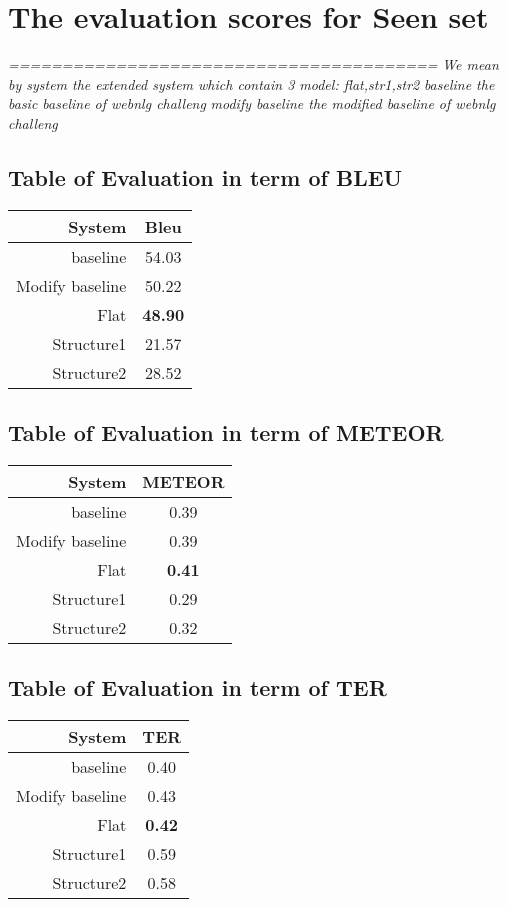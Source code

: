 \documentclass{article}%
\begin{document}
%
\normalsize%
\section{The evaluation scores for Seen set}%
\textit{========================================\newline%
}%
\textit{We mean by system the extended system which contain 3 model: flat,str1,str2\newline%
}%
\textit{baseline the basic baseline of webnlg challeng \newline%
}%
\textit{modify baseline the modified baseline of webnlg challeng \newline%
}%
\subsection{Table of Evaluation in term of BLEU \newline%
}%
\begin{tabular}{|r|c|}%
\hline%
\textbf{System}&\textbf{Bleu}\\%
\hline%
baseline&54.03\\%
\hline%
Modify baseline&50.22\\%
\hline%
Flat&\textbf{48.90}\\%
\hline%
Structure1&21.57\\%
\hline%
Structure2&28.52\\%
\hline%
\end{tabular}

%
\subsection{Table of Evaluation in term of METEOR \newline%
}%
\begin{tabular}{|r|c|}%
\hline%
\textbf{System}&\textbf{METEOR}\\%
\hline%
baseline&0.39\\%
\hline%
Modify baseline&0.39\\%
\hline%
Flat&\textbf{0.41}\\%
\hline%
Structure1&0.29\\%
\hline%
Structure2&0.32\\%
\hline%
\end{tabular}

%
\subsection{Table of Evaluation in term of TER \newline%
}%
\begin{tabular}{|r|c|}%
\hline%
\textbf{System}&\textbf{TER}\\%
\hline%
baseline&0.40\\%
\hline%
Modify baseline&0.43\\%
\hline%
Flat&\textbf{0.42}\\%
\hline%
Structure1&0.59\\%
\hline%
Structure2&0.58\\%
\hline%
\end{tabular}

%
\end{document}
